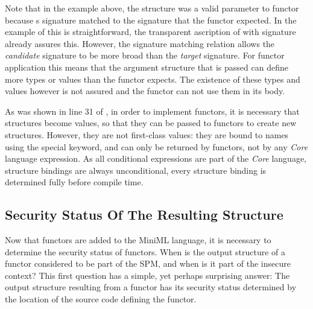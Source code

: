 \documentclass[10pt,a4paper,master=cws, masteroption=ai,english,inputenc=utf8]{kulemt}
\begin{document}
\noindent Note that in the example above, the structure  was a valid parameter to functor  because s signature matched to the  signature that the functor expected. In the example of  this is straightforward, the transparent ascription of  with signature  already assures this.
However, the signature matching relation allows the \emph{candidate} signature to be more broad than the \emph{target} signature.
For functor application this means that the argument structure that is passed can define more types or values than the functor expects.
The existence of these types and values however is not assured and the functor can not use them in its body. 

\smallskip

As was shown in line 31 of , in order to implement functors, it is necessary that structures become values, so that they can be passed to functors to create new structures. 
However, they are not first-class values: they are bound to names using the special  keyword, and can only be returned by functors, not by any \emph{Core} language expression.
As all conditional expressions are part of the \emph{Core} language, structure bindings are always unconditional, every structure binding is determined fully before compile time. 

\subsection{Security Status Of The Resulting Structure\label{sec:FunctorSecurityStatus}}
Now that functors are added to the MiniML language, it is necessary to determine the security status of functors. 
When is the output structure of a functor considered to be part of the SPM, and when is it part of the insecure context?
This first question has a simple, yet perhaps surprising answer:
The output structure resulting from a functor has its security status determined by the location of the source code defining the functor.
\end{document}

